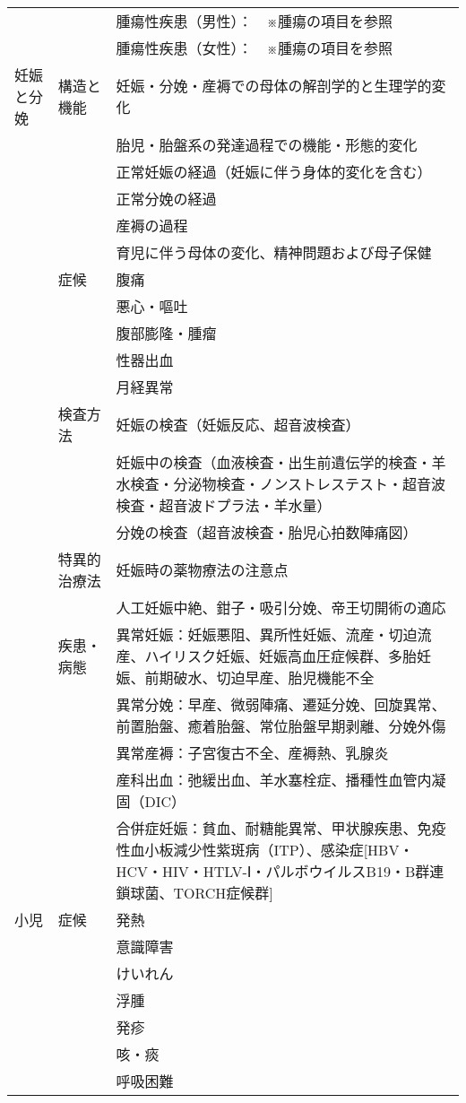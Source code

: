 \begin{xltabular}{\linewidth}{XXX}
 &  & 腫瘍性疾患（男性）：　※腫瘍の項目を参照 \\
 &  & 腫瘍性疾患（女性）：　※腫瘍の項目を参照 \\
妊娠と分娩 & 構造と機能 & 妊娠・分娩・産褥での母体の解剖学的と生理学的変化 \\
 &  & 胎児・胎盤系の発達過程での機能・形態的変化 \\
 &  & 正常妊娠の経過（妊娠に伴う身体的変化を含む） \\
 &  & 正常分娩の経過 \\
 &  & 産褥の過程 \\
 &  & 育児に伴う母体の変化、精神問題および母子保健 \\
 & 症候 & 腹痛 \\
 &  & 悪心・嘔吐 \\
 &  & 腹部膨隆・腫瘤 \\
 &  & 性器出血 \\
 &  & 月経異常 \\
 & 検査方法 & 妊娠の検査（妊娠反応、超音波検査） \\
 &  & 妊娠中の検査（血液検査・出生前遺伝学的検査・羊水検査・分泌物検査・ノンストレステスト・超音波検査・超音波ドプラ法・羊水量） \\
 &  & 分娩の検査（超音波検査・胎児心拍数陣痛図） \\
 & 特異的治療法 & 妊娠時の薬物療法の注意点 \\
 &  & 人工妊娠中絶、鉗子・吸引分娩、帝王切開術の適応 \\
 & 疾患・病態 & 異常妊娠：妊娠悪阻、異所性妊娠、流産・切迫流産、ハイリスク妊娠、妊娠高血圧症候群、多胎妊娠、前期破水、切迫早産、胎児機能不全 \\
 &  & 異常分娩：早産、微弱陣痛、遷延分娩、回旋異常、前置胎盤、癒着胎盤、常位胎盤早期剥離、分娩外傷 \\
 &  & 異常産褥：子宮復古不全、産褥熱、乳腺炎 \\
 &  & 産科出血：弛緩出血、羊水塞栓症、播種性血管内凝固（DIC） \\
 &  & 合併症妊娠：貧血、耐糖能異常、甲状腺疾患、免疫性血小板減少性紫斑病（ITP）、感染症[HBV・HCV・HIV・HTLV-Ⅰ・パルボウイルスB19・B群連鎖球菌、TORCH症候群] \\
小児 & 症候 & 発熱 \\
 &  & 意識障害 \\
 &  & けいれん \\
 &  & 浮腫 \\
 &  & 発疹 \\
 &  & 咳・痰 \\
 &  & 呼吸困難 \\

\end{xltabular}

